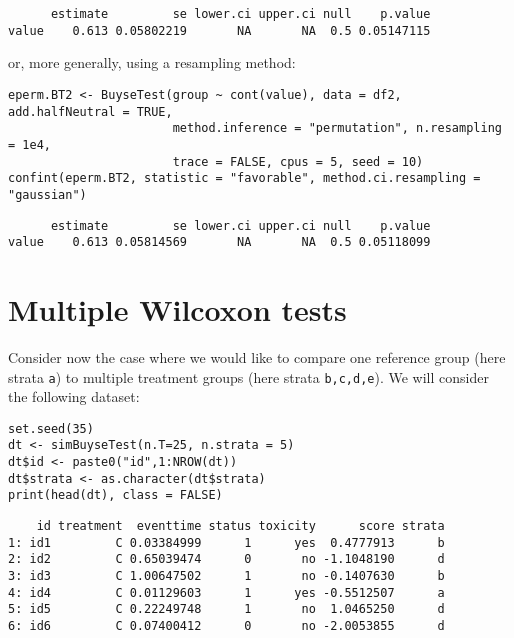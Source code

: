 \documentclass[12pt]{article}
\begin{document}
\begin{verbatim}
      estimate         se lower.ci upper.ci null    p.value
value    0.613 0.05802219       NA       NA  0.5 0.05147115
\end{verbatim}


or, more generally, using a resampling method:
\lstset{language=r,label= ,caption= ,captionpos=b,numbers=none}
\begin{lstlisting}
eperm.BT2 <- BuyseTest(group ~ cont(value), data = df2, add.halfNeutral = TRUE,
                       method.inference = "permutation", n.resampling = 1e4,
                       trace = FALSE, cpus = 5, seed = 10)
confint(eperm.BT2, statistic = "favorable", method.ci.resampling = "gaussian")
\end{lstlisting}

\begin{verbatim}
      estimate         se lower.ci upper.ci null    p.value
value    0.613 0.05814569       NA       NA  0.5 0.05118099
\end{verbatim}


\clearpage

\section{Multiple Wilcoxon tests}
\label{sec:org5bd74ec}

Consider now the case where we would like to compare one reference
group (here strata \texttt{a}) to multiple treatment groups (here strata
\texttt{b,c,d,e}). We will consider the following dataset:
\lstset{language=r,label= ,caption= ,captionpos=b,numbers=none}
\begin{lstlisting}
set.seed(35)
dt <- simBuyseTest(n.T=25, n.strata = 5)
dt$id <- paste0("id",1:NROW(dt))
dt$strata <- as.character(dt$strata) 
print(head(dt), class = FALSE)
\end{lstlisting}

\begin{verbatim}
    id treatment  eventtime status toxicity      score strata
1: id1         C 0.03384999      1      yes  0.4777913      b
2: id2         C 0.65039474      0       no -1.1048190      d
3: id3         C 1.00647502      1       no -0.1407630      b
4: id4         C 0.01129603      1      yes -0.5512507      a
5: id5         C 0.22249748      1       no  1.0465250      d
6: id6         C 0.07400412      0       no -2.0053855      d
\end{verbatim}
\end{document}
